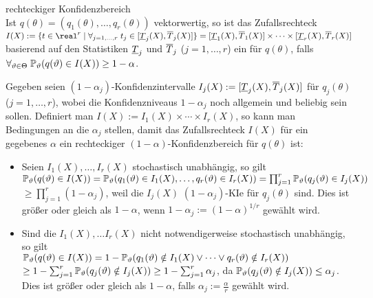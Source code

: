 \linie
\pagebreak

\begin{Def}{rechteckiger Konfidenzbereich}\\
    Ist $q(\theta) = (q_1(\theta), \dotsc, q_r(\theta))$ vektorwertig, so ist das Zufallsrechteck\\
    $I(X) := \{t \in \real^r \;|\; \forall_{j=1,\dotsc, r}\; t_j \in [\Tu_j(X), \To_j(X)]\}
    = [\Tu_1(X), \To_1(X)] \times \dotsb \times [\Tu_r(X), \To_r(X)]$
    basierend auf den Statistiken $\underline{T}_j$ und $\overline{T}_j$ ($j = 1, \dotsc, r$) ein
     für $q(\theta)$, falls
    $\forall_{\vartheta \in \Theta}\; \mathbb{P}_\vartheta(q(\vartheta) \in I(X)) \ge 1 - \alpha$.
\end{Def}

\begin{Bem}
    Gegeben seien $(1 - \alpha_j)$-Konfidenzintervalle $I_j(X) := [\underline{T}_j(X), \overline{T}_j(X)]$
    für $q_j(\theta)$ ($j = 1, \dotsc, r$), wobei die Konfidenzniveaus $1 - \alpha_j$ noch
    allgemein und beliebig sein sollen.
    Definiert man $I(X) := I_1(X) \times \dotsb \times I_r(X)$, so kann man Bedingungen an die
    $\alpha_j$ stellen, damit das Zufallsrechteck $I(X)$ für ein gegebenes $\alpha$
    ein rechteckiger $(1 - \alpha)$-Konfidenzbereich für $q(\theta)$ ist:
    \begin{itemize}
        \item
        Seien $I_1(X), \dotsc, I_r(X)$ stochastisch unabhängig,
        so gilt\\
        $\mathbb{P}_\vartheta(q(\vartheta) \in I(X)) = \mathbb{P}_\vartheta(q_1(\vartheta) \in I_1(X), \dotsc,
        q_r(\vartheta) \in I_r(X)) = \prod_{j=1}^r \mathbb{P}_\vartheta(q_j(\vartheta) \in I_j(X))$\\
        $\ge \prod_{j=1}^r (1 - \alpha_j)$,
        weil die $I_j(X)$ $(1 - \alpha_j)$-KIe für $q_j(\theta)$ sind.
        Dies ist größer oder gleich als $1 - \alpha$, wenn $1 - \alpha_j := (1 - \alpha)^{1/r}$
        gewählt wird.

        \item
        Sind die $I_1(X), \dotsc I_r(X)$ nicht notwendigerweise stochastisch unabhängig,
        so gilt\\
        $\mathbb{P}_\vartheta(q(\vartheta) \in I(X)) = 1 -
        \mathbb{P}_\vartheta(q_1(\vartheta) \notin I_1(X) \lor \dotsb \lor q_r(\vartheta) \notin I_r(X))$\\
        $\ge 1 - \sum_{j=1}^r \mathbb{P}_\vartheta(q_j(\vartheta) \notin I_j(X))
        \ge 1 - \sum_{j=1}^r \alpha_j$,
        da $\mathbb{P}_\vartheta(q_j(\vartheta) \notin I_j(X)) \le \alpha_j$.
        Dies ist größer oder gleich als $1 - \alpha$, falls $\alpha_j := \frac{\alpha}{r}$
        gewählt wird.
    \end{itemize}
\end{Bem}

